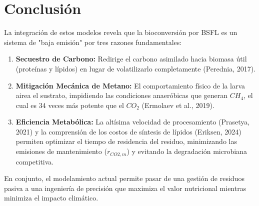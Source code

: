 \documentclass{article}
\begin{document}
\section{Conclusión}
La integración de estos modelos revela que la bioconversión por BSFL es un sistema de "baja emisión" por tres razones fundamentales: 
\begin{enumerate}
    \item \textbf{Secuestro de Carbono:} Redirige el carbono asimilado hacia biomasa útil (proteínas y lípidos) en lugar de volatilizarlo completamente (Perednia, 2017).
    \item \textbf{Mitigación Mecánica de Metano:} El comportamiento físico de la larva airea el sustrato, impidiendo las condiciones anaeróbicas que generan $CH_4$, el cual es 34 veces más potente que el $CO_2$ (Ermolaev et al., 2019).
    \item \textbf{Eficiencia Metabólica:} La altísima velocidad de procesamiento (Prasetya, 2021) y la comprensión de los costos de síntesis de lípidos (Eriksen, 2024) permiten optimizar el tiempo de residencia del residuo, minimizando las emisiones de mantenimiento ($r_{CO2,m}$) y evitando la degradación microbiana competitiva.
\end{enumerate}
En conjunto, el modelamiento actual permite pasar de una gestión de residuos pasiva a una ingeniería de precisión que maximiza el valor nutricional mientras minimiza el impacto climático.
\end{document}
